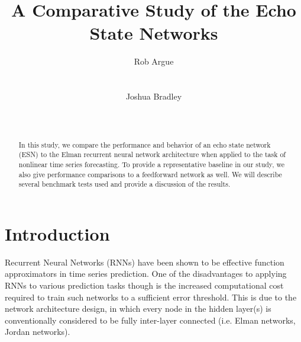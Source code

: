 \documentclass{acm_proc_article-sp}
\begin{document}
\title{A Comparative Study of the Echo State Networks}

\author{
\alignauthor
Rob Argue\\
       \\
       \\
\alignauthor
Joshua Bradley\\
       \\
       \\
}

\maketitle
\begin{abstract}
In this study, we compare the performance and behavior of an echo state network (ESN) to the Elman recurrent neural network architecture when applied to the task of nonlinear time series forecasting. To provide a representative baseline in our study, we also give performance comparisons to a feedforward network as well. We will describe several benchmark tests used and provide a discussion of the results.
\end{abstract}

\section{Introduction}
Recurrent Neural Networks (RNNs) have been shown to be effective function approximators in time series prediction. One of the disadvantages to applying RNNs to various prediction tasks though is the increased computational cost required to train such networks to a sufficient error threshold. This is due to the network architecture design, in which every node in the hidden layer(s) is conventionally considered to be fully inter-layer connected (i.e. Elman networks, Jordan networks).
\end{document}
